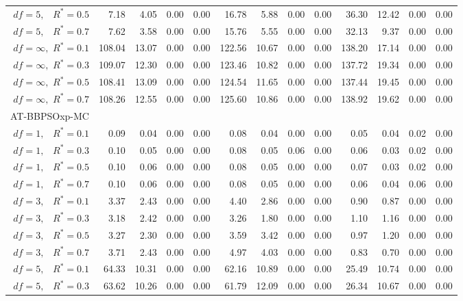 \documentclass[12pt]{article}
\begin{document}
\begin{table}[ht]
{\begin{tabular}{r|rrrr|rrrr|rrrr}
  $df = 5,\enspace$ $R^* =0.5$ & 7.18 & 4.05 & 0.00 & 0.00 & 16.78 & 5.88 & 0.00 & 0.00 & 36.30 & 12.42 & 0.00 & 0.00 \\ 
  $df = 5,\enspace$ $R^* =0.7$ & 7.62 & 3.58 & 0.00 & 0.00 & 15.76 & 5.55 & 0.00 & 0.00 & 32.13 & 9.37 & 0.00 & 0.00 \\ 
  $df = \infty,$ $R^* =0.1$ & 108.04 & 13.07 & 0.00 & 0.00 & 122.56 & 10.67 & 0.00 & 0.00 & 138.20 & 17.14 & 0.00 & 0.00 \\ 
  $df = \infty,$ $R^* =0.3$ & 109.07 & 12.30 & 0.00 & 0.00 & 123.46 & 10.82 & 0.00 & 0.00 & 137.72 & 19.34 & 0.00 & 0.00 \\ 
  $df = \infty,$ $R^* =0.5$ & 108.41 & 13.09 & 0.00 & 0.00 & 124.54 & 11.65 & 0.00 & 0.00 & 137.44 & 19.45 & 0.00 & 0.00 \\ 
  $df = \infty,$ $R^* =0.7$ & 108.26 & 12.55 & 0.00 & 0.00 & 125.60 & 10.86 & 0.00 & 0.00 & 138.92 & 19.62 & 0.00 & 0.00 \\ 
\hline
\multicolumn{1}{l|}{AT-BBPSOxp-MC} &&&&&&&&&&&&\\
  $df = 1,\enspace$ $R^* =0.1$ & 0.09 & 0.04 & 0.00 & 0.00 & 0.08 & 0.04 & 0.00 & 0.00 & 0.05 & 0.04 & 0.02 & 0.00 \\ 
  $df = 1,\enspace$ $R^* =0.3$ & 0.10 & 0.05 & 0.00 & 0.00 & 0.08 & 0.05 & 0.06 & 0.00 & 0.06 & 0.03 & 0.02 & 0.00 \\ 
  $df = 1,\enspace$ $R^* =0.5$ & 0.10 & 0.06 & 0.00 & 0.00 & 0.08 & 0.05 & 0.00 & 0.00 & 0.07 & 0.03 & 0.02 & 0.00 \\ 
  $df = 1,\enspace$ $R^* =0.7$ & 0.10 & 0.06 & 0.00 & 0.00 & 0.08 & 0.05 & 0.00 & 0.00 & 0.06 & 0.04 & 0.06 & 0.00 \\ 
  $df = 3,\enspace$ $R^* =0.1$ & 3.37 & 2.43 & 0.00 & 0.00 & 4.40 & 2.86 & 0.00 & 0.00 & 0.90 & 0.87 & 0.00 & 0.00 \\ 
  $df = 3,\enspace$ $R^* =0.3$ & 3.18 & 2.42 & 0.00 & 0.00 & 3.26 & 1.80 & 0.00 & 0.00 & 1.10 & 1.16 & 0.00 & 0.00 \\ 
  $df = 3,\enspace$ $R^* =0.5$ & 3.27 & 2.30 & 0.00 & 0.00 & 3.59 & 3.42 & 0.00 & 0.00 & 0.97 & 1.20 & 0.00 & 0.00 \\ 
  $df = 3,\enspace$ $R^* =0.7$ & 3.71 & 2.43 & 0.00 & 0.00 & 4.97 & 4.03 & 0.00 & 0.00 & 0.83 & 0.70 & 0.00 & 0.00 \\ 
  $df = 5,\enspace$ $R^* =0.1$ & 64.33 & 10.31 & 0.00 & 0.00 & 62.16 & 10.89 & 0.00 & 0.00 & 25.49 & 10.74 & 0.00 & 0.00 \\ 
  $df = 5,\enspace$ $R^* =0.3$ & 63.62 & 10.26 & 0.00 & 0.00 & 61.79 & 12.09 & 0.00 & 0.00 & 26.34 & 10.67 & 0.00 & 0.00 \\ 

\end{tabular}}
\end{table}
\end{document}
